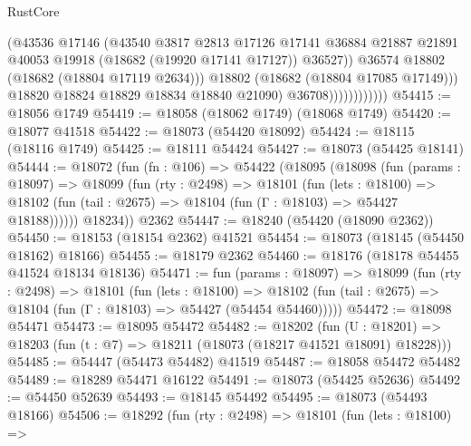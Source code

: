 \begin{lexlean}{RustCore}
\begin{coremodule}
                                  (@43536
                                    @17146
                                    (@43540
                                      @3817
                                      @2813
                                      @17126
                                      @17141
                                      @36884
                                      @21887
                                      @21891
                                      @40053
                                      @19918
                                      (@18682 (@19920 @17141 @17127))
                                      @36527))
                                  @36574
                                  @18802
                                  (@18682 (@18804 @17119 @2634)))
                                @18802
                                (@18682 (@18804 @17085 @17149)))
                              @18820
                              @18824
                              @18829
                              @18834
                              @18840
                              @21090)
                            @36708))))))))))))
@54415 := @18056 @1749
@54419 := @18058 (@18062 @1749) (@18068 @1749)
@54420 := @18077 @41518
@54422 := @18073 (@54420 @18092)
@54424 := @18115 (@18116 @1749)
@54425 := @18111 @54424
@54427 := @18073 (@54425 @18141)
@54444 := @18072
    (fun (fn : @106) =>
    @54422
      (@18095
        (@18098
          (fun (params : @18097) =>
          @18099
            (fun (rty : @2498) =>
            @18101
              (fun (lets : @18100) =>
              @18102 (fun (tail : @2675) => @18104 (fun (Γ : @18103) => @54427 @18188))))))
        @18234))
    @2362
@54447 := @18240 (@54420 (@18090 @2362))
@54450 := @18153 (@18154 @2362) @41521
@54454 := @18073 (@18145 (@54450 @18162) @18166)
@54455 := @18179 @2362
@54460 := @18176 (@18178 @54455 @41524 @18134 @18136)
@54471 := fun (params : @18097) =>
  @18099
    (fun (rty : @2498) =>
    @18101
      (fun (lets : @18100) =>
      @18102 (fun (tail : @2675) => @18104 (fun (Γ : @18103) => @54427 (@54454 @54460)))))
@54472 := @18098 @54471
@54473 := @18095 @54472
@54482 := @18202
    (fun (U : @18201) => @18203 (fun (t : @7) => @18211 (@18073 (@18217 @41521 @18091) @18228)))
@54485 := @54447 (@54473 @54482) @41519
@54487 := @18058 @54472 @54482
@54489 := @18289 @54471 @16122
@54491 := @18073 (@54425 @52636)
@54492 := @54450 @52639
@54493 := @18145 @54492
@54495 := @18073 (@54493 @18166)
@54506 := @18292
    (fun (rty : @2498) =>
    @18101
      (fun (lets : @18100) =>

\end{coremodule}
\end{lexlean}
